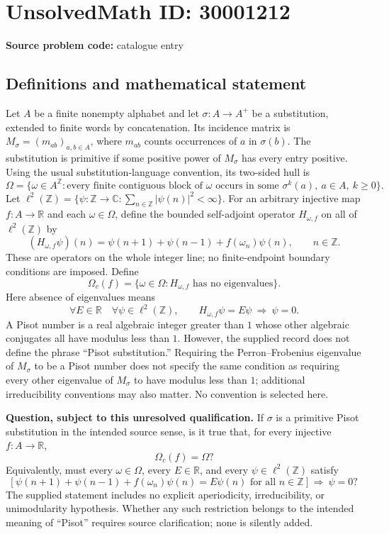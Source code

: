 \documentclass[11pt]{article}
\newcommand{\Z}{\mathbb{Z}}
\newcommand{\R}{\mathbb{R}}
\newcommand{\C}{\mathbb{C}}
\begin{document}
\section*{UnsolvedMath ID: 30001212}
\textbf{Source problem code:} catalogue entry
\subsection{Definitions and mathematical statement}
Let \(A\) be a finite nonempty alphabet and let \(\sigma:A\to A^+\) be a substitution, extended to finite words by concatenation. Its incidence matrix is \(M_\sigma=(m_{ab})_{a,b\in A}\), where \(m_{ab}\) counts occurrences of \(a\) in \(\sigma(b)\). The substitution is primitive if some positive power of \(M_\sigma\) has every entry positive. Using the usual substitution-language convention, its two-sided hull is
\[
\Omega=\{\omega\in A^{\Z}:\text{every finite contiguous block of }\omega\text{ occurs in some }\sigma^k(a),\ a\in A,\ k\geq0\}.
\]
Let \(\ell^2(\Z)=\{\psi:\Z\to\C:\sum_{n\in\Z}|\psi(n)|^2<\infty\}\). For an arbitrary injective map \(f:A\to\R\) and each \(\omega\in\Omega\), define the bounded self-adjoint operator \(H_{\omega,f}\) on all of \(\ell^2(\Z)\) by
\[
(H_{\omega,f}\psi)(n)=\psi(n+1)+\psi(n-1)+f(\omega_n)\psi(n),\qquad n\in\Z.
\]
These are operators on the whole integer line; no finite-endpoint boundary conditions are imposed. Define
\[
\Omega_c(f)=\{\omega\in\Omega:H_{\omega,f}\text{ has no eigenvalues}\}.
\]
Here absence of eigenvalues means
\[
\forall E\in\R\quad\forall\psi\in\ell^2(\Z),\qquad H_{\omega,f}\psi=E\psi\ \Longrightarrow\ \psi=0.
\]
A Pisot number is a real algebraic integer greater than \(1\) whose other algebraic conjugates all have modulus less than \(1\). However, the supplied record does not define the phrase ``Pisot substitution.'' Requiring the Perron--Frobenius eigenvalue of \(M_\sigma\) to be a Pisot number does not specify the same condition as requiring every other eigenvalue of \(M_\sigma\) to have modulus less than \(1\); additional irreducibility conventions may also matter. No convention is selected here.

\textbf{Question, subject to this unresolved qualification.} If \(\sigma\) is a primitive Pisot substitution in the intended source sense, is it true that, for every injective \(f:A\to\R\),
\[
\Omega_c(f)=\Omega?
\]
Equivalently, must every \(\omega\in\Omega\), every \(E\in\R\), and every \(\psi\in\ell^2(\Z)\) satisfy
\[
\bigl[\ \psi(n+1)+\psi(n-1)+f(\omega_n)\psi(n)=E\psi(n)\text{ for all }n\in\Z\ \bigr]\ \Longrightarrow\ \psi=0?
\]
The supplied statement includes no explicit aperiodicity, irreducibility, or unimodularity hypothesis. Whether any such restriction belongs to the intended meaning of ``Pisot'' requires source clarification; none is silently added.
\end{document}
